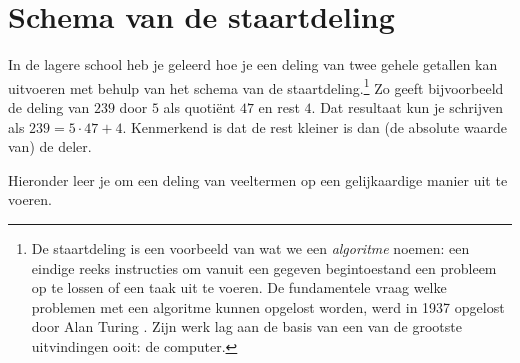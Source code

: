 \documentclass{ximera}
\begin{document}
\section{Schema van de staartdeling}

In de lagere school heb je geleerd hoe je een deling van twee gehele getallen kan uitvoeren met behulp van het schema van de staartdeling.\footnote{De staartdeling is een voorbeeld van wat we een {\em algoritme} noemen: een eindige reeks instructies om vanuit een gegeven begintoestand een probleem op te lossen of een taak uit te voeren. De fundamentele vraag welke problemen met een algoritme kunnen opgelost worden, werd in 1937 opgelost door Alan Turing \cite{Turing}. Zijn werk lag aan de basis van een van de grootste uitvindingen ooit: de computer.} Zo geeft bijvoorbeeld de deling van $239$ door $5$ als quoti\"ent $47$ en rest $4$. Dat resultaat kun je schrijven als $239 = 5 \cdot 47 + 4$. Kenmerkend is dat de rest kleiner is dan (de absolute waarde van) de deler. 

Hieronder leer je om een deling van veeltermen op een gelijkaardige manier uit te voeren.
\end{document}
